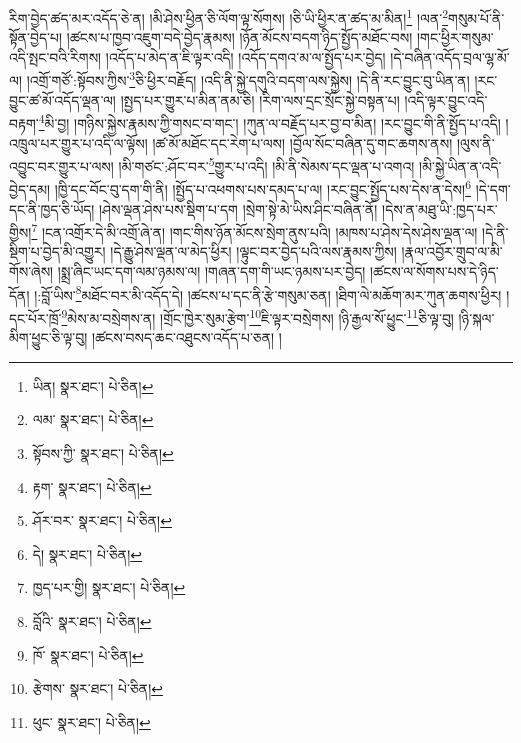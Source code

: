 རིག་བྱེད་ཚད་མར་འདོད་ཅེ་ན། །མི་ཤེས་ཕྱིན་ཅི་ལོག་ལྟ་སོགས། །ཅི་ཡི་ཕྱིར་ན་ཚད་མ་མིན།\footnote{ཡིན།  སྣར་ཐང་།  པེ་ཅིན། } །ལན་\footnote{ལམ་  སྣར་ཐང་།  པེ་ཅིན། }གསུམ་པོ་ནི་སྟོན་བྱེད་པ། །ཚངས་པ་ཁྱབ་འཇུག་བདེ་བྱེད་རྣམས། །ཉོན་མོངས་བདག་ཉིད་སྤྱོད་མཐོང་བས། །གང་ཕྱིར་གསུམ་འདི་སྤང་བའི་རིགས། །འདོད་པ་མེད་ན་ཇི་ལྟར་འདི། །འདོད་དགའ་མ་ལ་སྤྱོད་པར་བྱེད། །དེ་བཞིན་འདོད་བྲལ་ལྷ་མོ་ལ། །འགྲོ་གཙོ་:སྟོབས་ཀྱིས་\footnote{སྟོབས་ཀྱི་  སྣར་ཐང་།  པེ་ཅིན། }ཅི་ཕྱིར་བརྗོད། །འདི་ནི་སྐྱེ་དགུའི་བདག་ལས་སྐྱེས། །དེ་ནི་རང་བྱུང་བུ་ཡིན་ན། །རང་བྱུང་ཚ་མོ་འདོད་ལྡན་ལ། །སྤྱད་པར་གྱུར་པ་མིན་ནམ་ཅི། །རིག་ལས་དྲང་སྲོང་སྐྱེ་བསྟན་པ། །འདི་ལྟར་བྱུང་འདི་བརྟག་\footnote{རྟག་  སྣར་ཐང་།  པེ་ཅིན། }མི་བྱ། །གཉིས་སྐྱེས་རྣམས་ཀྱི་གསང་བ་གང་། །ཀུན་ལ་བརྗོད་པར་བྱ་བ་མིན། །རང་བྱུང་གི་ནི་སྤྱོད་པ་འདི། །འཁྲུལ་པར་གྱུར་པ་འདི་ལ་ལྟོས། །ཚ་མོ་མཐོང་དང་རེག་པ་ལས། །བྱོལ་སོང་བཞིན་དུ་གང་ཆགས་ནས། །ལུས་ནི་འབྱུང་བར་གྱུར་པ་ལས། །མི་གཙང་:ཤོང་བར་\footnote{ཤོར་བར་  སྣར་ཐང་།  པེ་ཅིན། }གྱུར་པ་འདི། །མི་ནི་སེམས་དང་ལྡན་པ་འགའ། །མི་སྐྱེ་ཡིན་ན་འདི་བྱེད་དམ། །ཁྱི་དང་བོང་བུ་དག་གི་ནི། །སྤྱོད་པ་འཕགས་པས་དམད་པ་ལ། །རང་བྱུང་སྤྱོད་པས་དེས་ན་དེས།\footnote{དེ།  སྣར་ཐང་།  པེ་ཅིན། } །དེ་དག་དང་ནི་ཁྱད་ཅི་ཡོད། །ཤེས་ལྡན་ཤེས་པས་སྡིག་པ་དག །སྲེག་སྟེ་མེ་ཡིས་ཤིང་བཞིན་ནོ། །དེས་ན་མཐུ་ཡི་:ཁྱད་པར་གྱིས།\footnote{ཁྱད་པར་གྱི།  སྣར་ཐང་།  པེ་ཅིན། } །ངན་འགྲོར་དེ་མི་འགྲོ་ཞེ་ན། །གང་གིས་ཉོན་མོངས་སྲེག་ནུས་པའི། །མཁས་པ་ཤེས་དེས་ཤེས་ལྡན་ལ། །དེ་ནི་སྡིག་པ་བྱེད་མི་འགྱུར། །དེ་རྒྱུ་ཤེས་ལྡན་ལ་མེད་ཕྱིར། །ལྟུང་བར་བྱེད་པའི་ལས་རྣམས་ཀྱིས། །རྣལ་འབྱོར་གྲུབ་ལ་མི་གོས་ཞེས། །སྨྲ་ཞིང་ཡང་དག་ལམ་ཉམས་ལ། །གཞན་དག་གི་ཡང་ཉམས་པར་བྱེད། །ཚངས་ལ་སོགས་པས་དེ་ཉིད་དོན། །:བློ་ཡིས་\footnote{བློའི་  སྣར་ཐང་།  པེ་ཅིན། }མཐོང་བར་མི་འདོད་དེ། །ཚངས་པ་དང་ནི་རྩེ་གསུམ་ཅན། །ཐིག་ལེ་མཆོག་མར་ཀུན་ཆགས་ཕྱིར། །དང་པོར་ཁྲོ་\footnote{ཁོ་  སྣར་ཐང་།  པེ་ཅིན། }མེས་མ་བསྲེགས་ན། །གྲོང་ཁྱེར་སུམ་རྩེག་\footnote{རྩེགས་  སྣར་ཐང་།  པེ་ཅིན། }ཇི་ལྟར་བསྲེགས། །ཉི་རྒྱལ་སོ་ཕྱུང་\footnote{ཕུང་  སྣར་ཐང་།  པེ་ཅིན། }ཅི་ལྟ་བུ། །ཉི་སྐལ་མིག་ཕྱུང་ཅི་ལྟ་བུ། །ཚངས་བསད་ཆང་འཐུངས་འདོད་པ་ཅན། །
